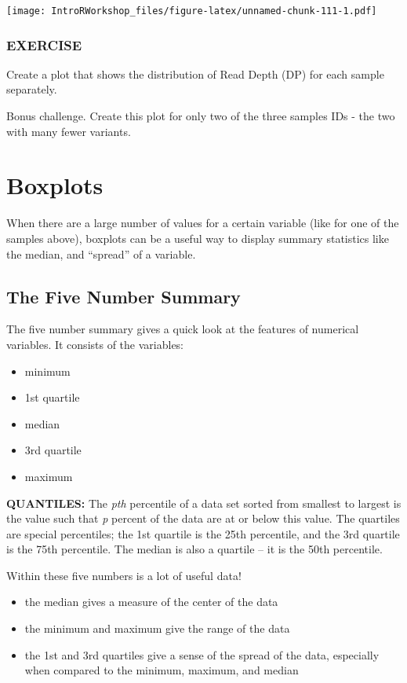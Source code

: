 \documentclass[
]{book}
\providecommand{\tightlist}{%
  \setlength{\itemsep}{0pt}\setlength{\parskip}{0pt}}
\begin{document}
\texttt{[image: IntroRWorkshop\_files/figure-latex/unnamed-chunk-111-1.pdf]}

\subsubsection*{EXERCISE}\label{exercise-6}

Create a plot that shows the distribution of Read Depth (DP) for each sample separately.

Bonus challenge. Create this plot for only two of the three samples IDs - the two with many fewer variants.

\section{Boxplots}\label{boxplots}

When there are a large number of values for a certain variable (like for one of the samples above), boxplots can be a useful way to display summary statistics like the median, and ``spread'' of a variable.

\subsection*{The Five Number Summary}\label{the-five-number-summary}

The five number summary gives a quick look at the features of numerical variables. It consists of the variables:

\begin{itemize}
\tightlist
\item
  minimum
\item
  1st quartile
\item
  median
\item
  3rd quartile
\item
  maximum
\end{itemize}

\textbf{QUANTILES:} The \emph{pth} percentile of a data set sorted from smallest to largest is the value such that \emph{p} percent of the data are at or below this value. The quartiles are special percentiles; the 1st quartile is the 25th percentile, and the 3rd quartile is the 75th percentile. The median is also a quartile -- it is the 50th percentile.

Within these five numbers is a lot of useful data!

\begin{itemize}
\tightlist
\item
  the median gives a measure of the center of the data
\item
  the minimum and maximum give the range of the data
\item
  the 1st and 3rd quartiles give a sense of the spread of the data, especially when compared to the minimum, maximum, and median
\end{itemize}
\end{document}
